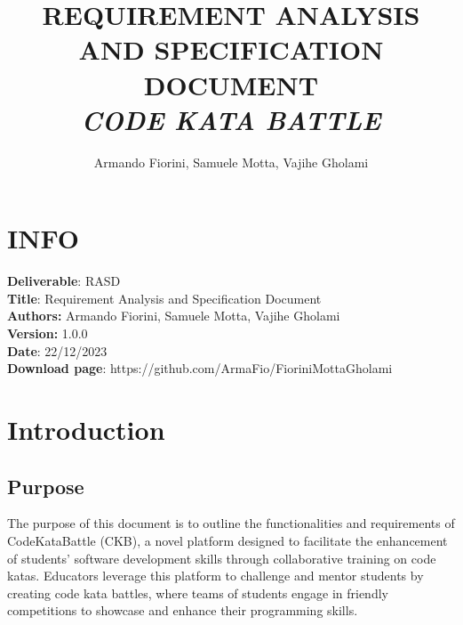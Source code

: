 \documentclass{article}
\title{\textbf{REQUIREMENT ANALYSIS AND SPECIFICATION DOCUMENT}\\\textit{CODE KATA BATTLE}}
\author{Armando Fiorini, Samuele Motta, Vajihe Gholami}
\date{}
\begin{document}
\maketitle
\section*{INFO}
\textbf{Deliverable}: RASD\\
\textbf{Title}: Requirement Analysis and Specification Document\\
\textbf{Authors:} Armando Fiorini, Samuele Motta, Vajihe Gholami\\
\textbf{Version:} 1.0.0\\
\textbf{Date}: 22/12/2023\\
\textbf{Download page}: https://github.com/ArmaFio/FioriniMottaGholami\\
\newpage
\tableofcontents
\newpage


\section{Introduction}
\subsection{Purpose}
The purpose of this document is to outline the functionalities and requirements of CodeKataBattle (CKB), a novel platform designed to facilitate the enhancement of students' software development skills through collaborative training on code katas. Educators leverage this platform to challenge and mentor students by creating code kata battles, where teams of students engage in friendly competitions to showcase and enhance their programming skills.
\end{document}
